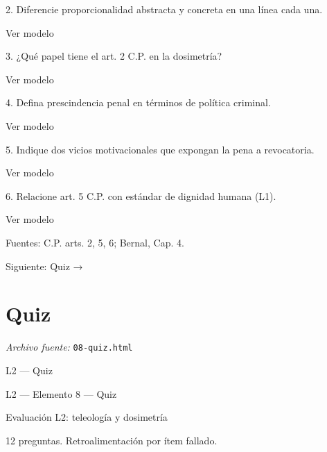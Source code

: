 \documentclass[11pt,a4paper]{article}
\begin{document}
      2. Diferencie proporcionalidad abstracta y concreta en una línea cada una.\par

      Ver modelo\par





      3. ¿Qué papel tiene el art. 2 C.P. en la dosimetría?\par

      Ver modelo\par





      4. Defina prescindencia penal en términos de política criminal.\par

      Ver modelo\par





      5. Indique dos vicios motivacionales que expongan la pena a revocatoria.\par

      Ver modelo\par





      6. Relacione art. 5 C.P. con estándar de dignidad humana (L1).\par

      Ver modelo\par




    Fuentes: C.P. arts. 2, 5, 6; Bernal, Cap. 4.\par

    Siguiente: Quiz →\par

\section{Quiz}
\noindent\textit{Archivo fuente:} \texttt{08-quiz.html}

L2 — Quiz\par





    L2 — Elemento 8 — Quiz\par
    Evaluación L2: teleología y dosimetría\par

    12 preguntas. Retroalimentación por ítem fallado.\par
\end{document}
